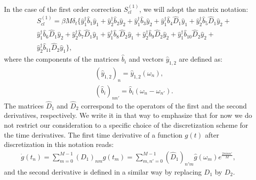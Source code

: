 \documentclass{article}
\begin{document}
In the case of the first order correction $S_{cl}^{(1)}$, we will adopt the matrix notation: 
\begin{eqnarray}\label{BS_1matrix}
    &&S_{cl}^{(1)} = \beta M \delta_{t} \big\{\hat{y}_{1}^{\dag}\hat{b}_{1}\hat{y}_{1} + \hat{y}_{2}^{\dag}\hat{b}_{2}\hat{y}_{2} + \hat{y}_{1}^{\dag}\hat{b}_{3}\hat{y}_{2} + \hat{y}_{1}^{\dag}\hat{b}_{4}\hat{D}_{1}\hat{y}_{1} + \hat{y}_{2}^{\dag}\hat{b}_{5}\hat{D}_{1}\hat{y}_{2} + \nonumber\\
    && \hat{y}_{1}^{\dag}\hat{b}_{6}\hat{D}_{1}\hat{y}_{2} + \hat{y}_{2}^{\dag}\hat{b}_{7}\hat{D}_{1}\hat{y}_{1} + \hat{y}_{1}^{\dag}\hat{b}_{8}\hat{D}_{2}\hat{y}_{1} + 
    \hat{y}_{2}^{\dag}\hat{b}_{9}\hat{D}_{2}\hat{y}_{2} + 
    \hat{y}_{1}^{\dag}\hat{b}_{10}\hat{D}_{2}\hat{y}_{2} + \nonumber\\
    && \hat{y}_{2}^{\dag}\hat{b}_{11}\hat{D}_{2}\hat{y}_{1}\big\},
\end{eqnarray}
where the components of the matrices $\hat{b}_{i}$ and vectors $\hat{y}_{1,2}$ are defined as: 
\begin{eqnarray}
    &&(\hat{y}_{1,2})_{n} = \hat{y}_{1,2} (\omega_{n}),\\
    &&(\hat{b}_{i})_{n n'} = \hat{b}_{i}(\omega_{n} - \omega_{n'}).\label{Bbmatrix}
\end{eqnarray}
The matrices $\hat{D}_{1}$ and $\hat{D}_{2}$ correspond to the operators of the first and the second derivatives, respectively. We write it in that way to emphasize that for now we do not restrict our consideration to a specific choice of the discretization scheme for the time derivatives. The first time derivative of a function $g(t)$ after discretization in this notation reads: 
\begin{eqnarray}
    \dot{g}(t_{n}) = \sum_{m=0}^{M-1} (D_1)_{nm}g(t_{m}) = \sum_{m,n'=0}^{M-1} (\hat{D}_{1})_{n'm}\hat{g}(\omega_{m})e^{\frac{2\pi i n n'}{M}},
\end{eqnarray}
and the second derivative is defined in a similar way by replacing $D_{1}$ by $D_{2}$.
\end{document}
